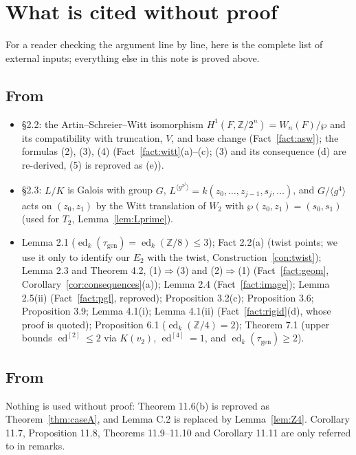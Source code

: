 \documentclass[11pt]{amsart}
\theoremstyle{definition}
\theoremstyle{remark}
\newcommand{\ed}{\operatorname{ed}}
\newcommand{\edd}[1]{\ed^{[#1]}}
\newcommand{\gen}{\mathrm{gen}}
\newcommand{\Z}{\mathbb Z}
\begin{document}
\section{What is cited without proof}\label{sec:inputs}

For a reader checking the argument line by line, here is the complete list of external
inputs; everything else in this note is proved above.

\subsection*{From \cite{P}}
\begin{itemize}
\item \S2.2: the Artin--Schreier--Witt isomorphism $H^1(F,\Z/2^n)=W_n(F)/\wp$ and its
compatibility with truncation, $V$, and base change (Fact~\ref{fact:asw}); the formulas
(2), (3), (4) (Fact~\ref{fact:witt}(a)--(c); (3) and its consequence (d) are re-derived,
(5) is reproved as (e)).
\item \S2.3: $L/K$ is Galois with group $G$, $L^{\langle g^{2^j}\rangle}=k(z_0,\dots,z_{j-1},s_j,\dots)$,
and $G/\langle g^4\rangle$ acts on $(z_0,z_1)$ by the Witt translation of $W_2$ with
$\wp(z_0,z_1)=(s_0,s_1)$ (used for $T_2$, Lemma~\ref{lem:Lprime}).
\item Lemma 2.1 ($\ed_k(\tau_{\gen})=\ed_k(\Z/8)\le3$); Fact 2.2(a) (twist points; we use
it only to identify our $E_2$ with the twist, Construction~\ref{con:twist}); Lemma 2.3 and
Theorem 4.2, (1)$\Rightarrow$(3) and (2)$\Rightarrow$(1) (Fact~\ref{fact:geom},
Corollary~\ref{cor:consequences}(a)); Lemma 2.4 (Fact~\ref{fact:image}); Lemma 2.5(ii)
(Fact~\ref{fact:pgl}, reproved); Proposition 3.2(c); Proposition 3.6; Proposition 3.9;
Lemma 4.1(i); Lemma 4.1(ii) (Fact~\ref{fact:rigid}(d), whose proof is quoted);
Proposition 6.1 ($\ed_k(\Z/4)=2$); Theorem 7.1 (upper bounds $\edd2\le2$ via $K(v_2)$,
$\edd4=1$, and $\ed_k(\tau_{\gen})\ge2$).
\end{itemize}

\subsection*{From \cite{A}}
Nothing is used without proof: Theorem 11.6(b) is reproved as Theorem~\ref{thm:caseA},
and Lemma C.2 is replaced by Lemma~\ref{lem:Z4}. Corollary 11.7, Proposition 11.8,
Theorems 11.9--11.10 and Corollary 11.11 are only referred to in remarks.
\end{document}
